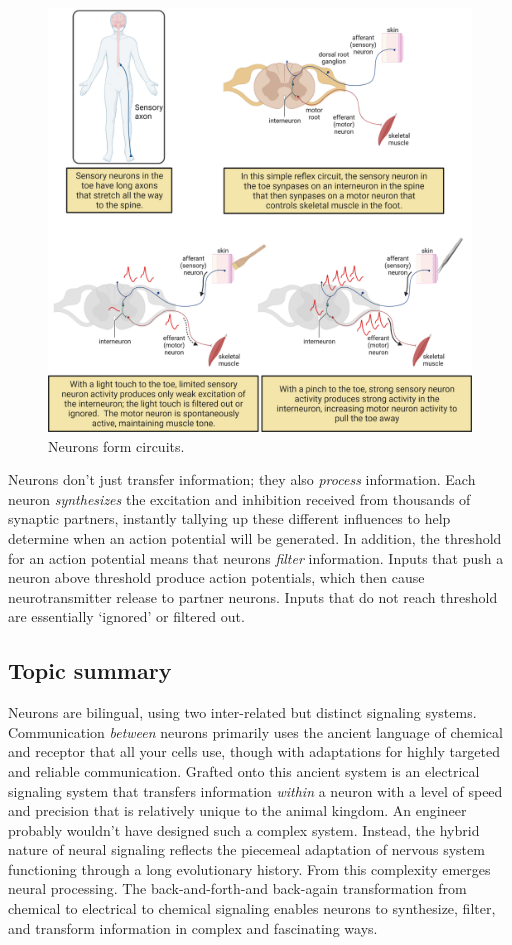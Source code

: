 \documentclass[
]{book}
\begin{document}
\begin{figure}

{\centering \includegraphics[width=0.9\linewidth]{images/ch02/02_06} 

}

\caption{Neurons form circuits.}\label{fig:ch02-06}
\end{figure}

Neurons don't just transfer information; they also \emph{process} information. Each neuron \emph{synthesizes} the excitation and inhibition received from thousands of synaptic partners, instantly tallying up these different influences to help determine when an action potential will be generated. In addition, the threshold for an action potential means that neurons \emph{filter} information. Inputs that push a neuron above threshold produce action potentials, which then cause neurotransmitter release to partner neurons. Inputs that do not reach threshold are essentially `ignored' or filtered out.

\hypertarget{topic-summary}{%
\subsection{Topic summary}\label{topic-summary}}

Neurons are bilingual, using two inter-related but distinct signaling systems. Communication \emph{between} neurons primarily uses the ancient language of chemical and receptor that all your cells use, though with adaptations for highly targeted and reliable communication. Grafted onto this ancient system is an electrical signaling system that transfers information \emph{within} a neuron with a level of speed and precision that is relatively unique to the animal kingdom. An engineer probably wouldn't have designed such a complex system. Instead, the hybrid nature of neural signaling reflects the piecemeal adaptation of nervous system functioning through a long evolutionary history. From this complexity emerges neural processing. The back-and-forth-and back-again transformation from chemical to electrical to chemical signaling enables neurons to synthesize, filter, and transform information in complex and fascinating ways.
\end{document}
